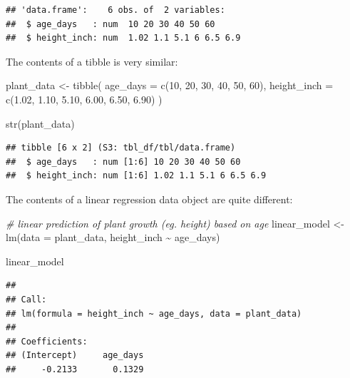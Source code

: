 \documentclass[
]{book}
\newenvironment{Shaded}{\begin{snugshade}}{\end{snugshade}}
\newcommand{\AttributeTok}[1]{\textcolor[rgb]{0.77,0.63,0.00}{#1}}
\newcommand{\CommentTok}[1]{\textcolor[rgb]{0.56,0.35,0.01}{\textit{#1}}}
\newcommand{\DecValTok}[1]{\textcolor[rgb]{0.00,0.00,0.81}{#1}}
\newcommand{\FloatTok}[1]{\textcolor[rgb]{0.00,0.00,0.81}{#1}}
\newcommand{\FunctionTok}[1]{\textcolor[rgb]{0.00,0.00,0.00}{#1}}
\newcommand{\NormalTok}[1]{#1}
\newcommand{\OtherTok}[1]{\textcolor[rgb]{0.56,0.35,0.01}{#1}}
\newcommand{\SpecialCharTok}[1]{\textcolor[rgb]{0.00,0.00,0.00}{#1}}
\begin{document}
\begin{verbatim}
## 'data.frame':    6 obs. of  2 variables:
##  $ age_days   : num  10 20 30 40 50 60
##  $ height_inch: num  1.02 1.1 5.1 6 6.5 6.9
\end{verbatim}

The contents of a tibble is very similar:

\begin{Shaded}
\begin{Highlighting}[]
\NormalTok{plant\_data }\OtherTok{\textless{}{-}} \FunctionTok{tibble}\NormalTok{(}
  \AttributeTok{age\_days =} \FunctionTok{c}\NormalTok{(}\DecValTok{10}\NormalTok{, }\DecValTok{20}\NormalTok{, }\DecValTok{30}\NormalTok{, }\DecValTok{40}\NormalTok{, }\DecValTok{50}\NormalTok{, }\DecValTok{60}\NormalTok{),}
  \AttributeTok{height\_inch =} \FunctionTok{c}\NormalTok{(}\FloatTok{1.02}\NormalTok{, }\FloatTok{1.10}\NormalTok{, }\FloatTok{5.10}\NormalTok{, }\FloatTok{6.00}\NormalTok{, }\FloatTok{6.50}\NormalTok{, }\FloatTok{6.90}\NormalTok{)}
\NormalTok{)}

\FunctionTok{str}\NormalTok{(plant\_data)}
\end{Highlighting}
\end{Shaded}

\begin{verbatim}
## tibble [6 x 2] (S3: tbl_df/tbl/data.frame)
##  $ age_days   : num [1:6] 10 20 30 40 50 60
##  $ height_inch: num [1:6] 1.02 1.1 5.1 6 6.5 6.9
\end{verbatim}

The contents of a linear regression data object are quite different:

\begin{Shaded}
\begin{Highlighting}[]
\CommentTok{\# linear prediction of plant growth (eg. height) based on age}
\NormalTok{linear\_model }\OtherTok{\textless{}{-}} \FunctionTok{lm}\NormalTok{(}\AttributeTok{data =}\NormalTok{ plant\_data, height\_inch }\SpecialCharTok{\textasciitilde{}}\NormalTok{ age\_days)}

\NormalTok{linear\_model}
\end{Highlighting}
\end{Shaded}

\begin{verbatim}
## 
## Call:
## lm(formula = height_inch ~ age_days, data = plant_data)
## 
## Coefficients:
## (Intercept)     age_days  
##     -0.2133       0.1329
\end{verbatim}
\end{document}
